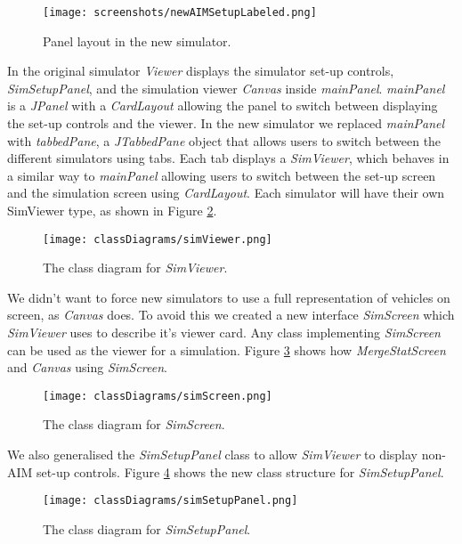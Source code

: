 \begin{figure}[htb]
\texttt{[image: screenshots/newAIMSetupLabeled.png]}
\caption{Panel layout in the new simulator.}
\label{fig:newAIMSetupLabeled}
\end{figure}

In the original simulator \emph{Viewer} displays the simulator set-up controls, \emph{SimSetupPanel}, and the simulation viewer \emph{Canvas} inside \emph{mainPanel}. \emph{mainPanel} is a \emph{JPanel} with a \emph{CardLayout} allowing the panel to switch between displaying the set-up controls and the viewer. In the new simulator we replaced \emph{mainPanel} with \emph{tabbedPane}, a \emph{JTabbedPane} object that allows users to switch between the different simulators using tabs. Each tab displays a \emph{SimViewer}, which behaves in a similar way to \emph{mainPanel} allowing users to switch between the set-up screen and the simulation screen using \emph{CardLayout}. Each simulator will have their own SimViewer type, as shown in Figure \ref{fig:simViewer}.

\begin{figure}[htb]
\texttt{[image: classDiagrams/simViewer.png]}
\caption{The class diagram for \emph{SimViewer}.}
\label{fig:simViewer}
\end{figure}

We didn't want to force new simulators to use a full representation of vehicles on screen, as \emph{Canvas} does. To avoid this we created a new interface \emph{SimScreen} which \emph{SimViewer} uses to describe it's viewer card. Any class implementing \emph{SimScreen} can be used as the viewer for a simulation. Figure \ref{fig:simScreen} shows how \emph{MergeStatScreen} and \emph{Canvas} using \emph{SimScreen}.

\begin{figure}[htb]
\texttt{[image: classDiagrams/simScreen.png]}
\caption{The class diagram for \emph{SimScreen}.}
\label{fig:simScreen}
\end{figure}

We also generalised the \emph{SimSetupPanel} class to allow \emph{SimViewer} to display non-AIM set-up controls. Figure \ref{fig:simSetupPanel} shows the new class structure for \emph{SimSetupPanel}.

\begin{figure}[htb]
\texttt{[image: classDiagrams/simSetupPanel.png]}
\caption{The class diagram for \emph{SimSetupPanel}.}
\label{fig:simSetupPanel}
\end{figure}

